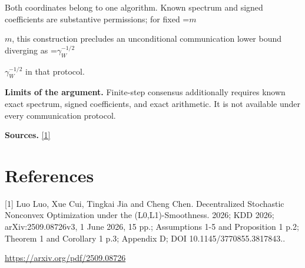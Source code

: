\documentclass[10pt,a4paper]{article}
\newcommand{\AtlasMath}[1]{\par\begingroup\centering\setbox0=\hbox{$\displaystyle #1$}\ifdim\wd0>1.4\linewidth\typeout{ATLAS WIDE FORMULA: \the\wd0}\fi\ifdim\wd0>\linewidth\resizebox{\linewidth}{!}{\box0}\else\box0\fi\par\endgroup}
\newcommand{\AtlasInlineMath}[1]{\begingroup\setbox0=\hbox{$#1$}\ifdim\wd0>.4\linewidth\endgroup\AtlasMath{#1}\else\endgroup$#1$\fi}
\begin{document}
Both coordinates belong to one algorithm. Known spectrum and signed coefficients are substantive permissions; for fixed \AtlasInlineMath{m}, this construction precludes an unconditional communication lower bound diverging as \AtlasInlineMath{\gamma_W^{-1/2}} in that protocol.

\textbf{Limits of the argument.} Finite-step consensus additionally requires known exact spectrum, signed coefficients, and exact arithmetic. It is not available under every communication protocol.

\textbf{Sources.} \href{https://arxiv.org/pdf/2509.08726}{[1]}

\section{References}
[1] Luo Luo, Xue Cui, Tingkai Jia and Cheng Chen. Decentralized Stochastic Nonconvex Optimization under the (L0,L1)-Smoothness. 2026; KDD 2026; arXiv:2509.08726v3, 1 June 2026, 15 pp.; Assumptions 1-5 and Proposition 1 p.2; Theorem 1 and Corollary 1 p.3; Appendix D; DOI 10.1145/3770855.3817843..

\url{https://arxiv.org/pdf/2509.08726}
\end{document}
